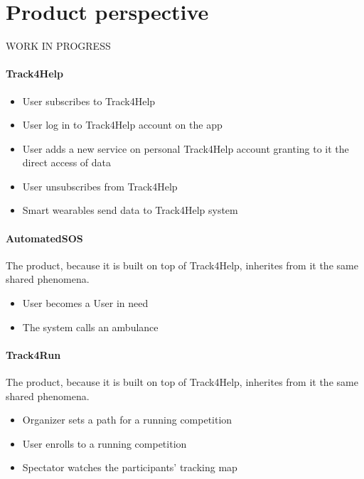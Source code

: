 \documentclass[../../rasd.tex]{subfiles}
\begin{document}
	
	\section{Product perspective}
		WORK IN PROGRESS\\
		\paragraph{Track4Help}
		\begin{itemize}
			\item User subscribes to Track4Help
			\item User log in to Track4Help account on the app
			\item User adds a new service on personal Track4Help account granting to it the direct access of data
			\item User unsubscribes from Track4Help
			\item Smart wearables send data to Track4Help system
		\end{itemize}
		\paragraph{AutomatedSOS}
		The product, because it is built on top of Track4Help, inherites from it the same shared phenomena.
		\begin{itemize}
			\item User becomes a User in need
			\item The system calls an ambulance
		\end{itemize}
		\paragraph{Track4Run}
		The product, because it is built on top of Track4Help, inherites from it the same shared phenomena.
		\begin{itemize}
			\item Organizer sets a path for a running competition
			\item User enrolls to a running competition
			\item Spectator watches the participants' tracking map			
		\end{itemize}
\end{document}
